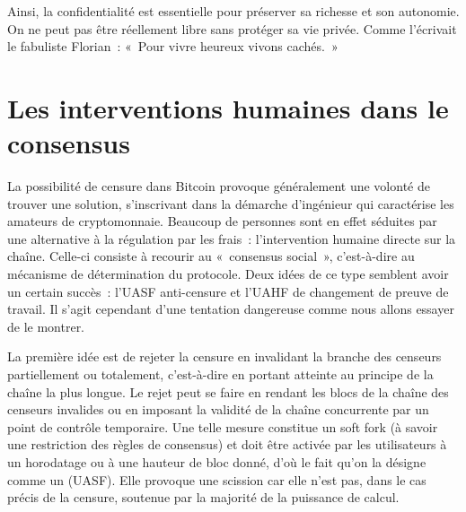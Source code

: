 Ainsi, la confidentialité est essentielle pour préserver sa richesse et son autonomie. On ne peut pas être réellement libre sans protéger sa vie privée. Comme l'écrivait le fabuliste Florian~: «~Pour vivre heureux vivons cachés.~»

\section*{Les interventions humaines dans le consensus}

La possibilité de censure dans Bitcoin provoque généralement une volonté de trouver une solution, s'inscrivant dans la démarche d'ingénieur qui caractérise les amateurs de cryptomonnaie. Beaucoup de personnes sont en effet séduites par une alternative à la régulation par les frais~: l'intervention humaine directe sur la chaîne. Celle-ci consiste à recourir au «~consensus social~», c'est-à-dire au mécanisme de détermination du protocole. Deux idées de ce type semblent avoir un certain succès~: l'UASF anti-censure et l'UAHF de changement de preuve de travail. Il s'agit cependant d'une tentation dangereuse comme nous allons essayer de le montrer.



La première idée est de rejeter la censure en invalidant la branche des censeurs partiellement ou totalement, c'est-à-dire en portant atteinte au principe de la chaîne la plus longue. Le rejet peut se faire en rendant les blocs de la chaîne des censeurs invalides ou en imposant la validité de la chaîne concurrente par un point de contrôle temporaire. Une telle mesure constitue un soft fork (à savoir une restriction des règles de consensus) et doit être activée par les utilisateurs à un horodatage ou à une hauteur de bloc donné, d'où le fait qu'on la désigne comme un  (UASF). Elle provoque une scission car elle n'est pas, dans le cas précis de la censure, soutenue par la majorité de la puissance de calcul.

